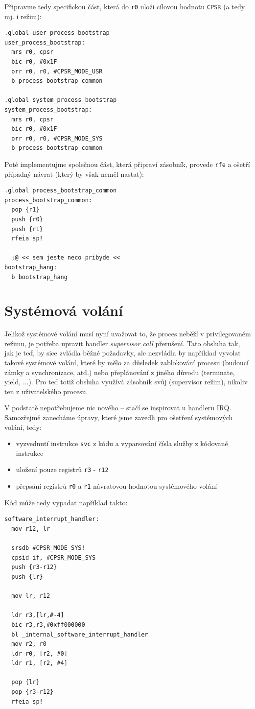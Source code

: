 \documentclass{article}
\begin{document}
Připravme tedy specifickou část, která do {\tt r0} uloží cílovou hodnotu {\tt CPSR} (a tedy mj. i režim):
\begin{lstlisting}
.global user_process_bootstrap
user_process_bootstrap:
  mrs r0, cpsr
  bic r0, #0x1F
  orr r0, r0, #CPSR_MODE_USR
  b process_bootstrap_common

.global system_process_bootstrap
system_process_bootstrap:
  mrs r0, cpsr
  bic r0, #0x1F
  orr r0, r0, #CPSR_MODE_SYS
  b process_bootstrap_common
\end{lstlisting}

Poté implementujme společnou část, která připraví zásobník, provede {\tt rfe} a ošetří případný návrat (který by však neměl nastat):
\begin{lstlisting}
.global process_bootstrap_common
process_bootstrap_common:
  pop {r1}
  push {r0}
  push {r1}
  rfeia sp!

  ;@ << sem jeste neco pribyde <<
bootstrap_hang:
  b bootstrap_hang
\end{lstlisting}

\section{Systémová volání}

Jelikož systémové volání musí nyní uvažovat to, že proces neběží v privilegovaném režimu, je potřeba upravit handler \emph{supervisor call} přerušení. Tato obsluha tak, jak je teď, by sice zvládla běžné požadavky, ale nezvládla by například vyvolat takové systémové volání, které by mělo za důsledek zablokování procesu (budoucí zámky a synchronizace, atd.) nebo přeplánování z jiného důvodu (terminate, yield, ...). Pro teď totiž obsluha využívá zásobník svůj (supervisor režim), nikoliv ten z uživatelského procesu.

V podstatě nepotřebujeme nic nového -- stačí se inspirovat u handleru IRQ. Samozřejmě zanecháme úpravy, které jsme zavedli pro ošetření systémových volání, tedy:
\begin{itemize}
	\item vyzvednutí instrukce {\tt svc} z kódu a vyparsování čísla služby z kódované instrukce
	\item uložení pouze registrů {\tt r3} - {\tt r12}
	\item přepsání registrů {\tt r0} a {\tt r1} návratovou hodnotou systémového volání
\end{itemize}

Kód může tedy vypadat například takto:
\begin{lstlisting}[language={[ARM]Assembler}]
software_interrupt_handler:
  mov r12, lr

  srsdb #CPSR_MODE_SYS!
  cpsid if, #CPSR_MODE_SYS
  push {r3-r12}
  push {lr}

  mov lr, r12

  ldr r3,[lr,#-4]
  bic r3,r3,#0xff000000
  bl _internal_software_interrupt_handler
  mov r2, r0
  ldr r0, [r2, #0]
  ldr r1, [r2, #4]

  pop {lr}
  pop {r3-r12}
  rfeia sp!
\end{lstlisting}
\end{document}
